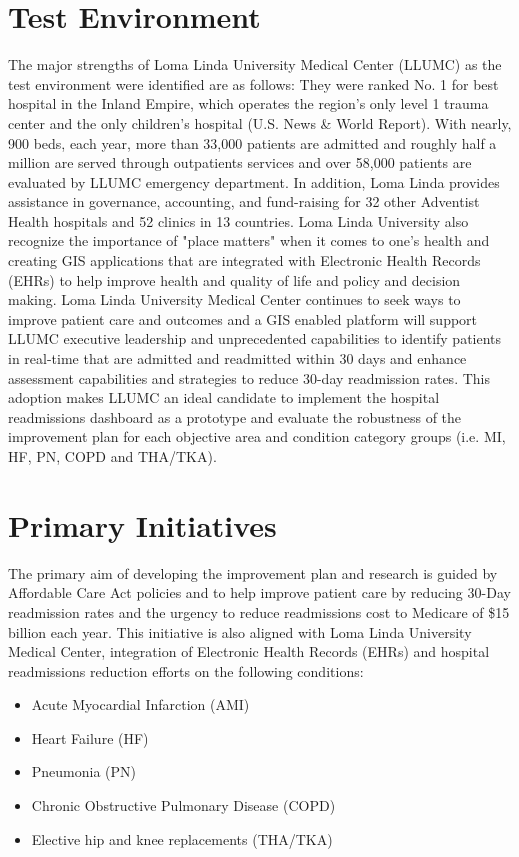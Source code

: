 \documentclass[11pt]{article}\usepackage[]{graphicx}\usepackage[]{color}
\begin{document}
\section{Test  Environment}
The major strengths of Loma Linda University Medical Center (LLUMC) as the test environment were identified are as follows: They were ranked No. 1 for best hospital in the Inland Empire, which operates the region's only level 1 trauma center and the only children's hospital (U.S. News & World Report). With nearly, 900 beds, each year, more than 33,000 patients are admitted and roughly half a million are served through outpatients services and over 58,000 patients are evaluated by LLUMC emergency department. In addition, Loma Linda provides assistance in governance, accounting, and fund-raising for 32 other Adventist Health hospitals and 52 clinics in 13 countries. Loma Linda University also recognize the importance of "place matters" when it comes to one's health and creating GIS applications that are integrated with Electronic Health Records (EHRs) to help improve health and quality of life and policy and decision making. Loma Linda University Medical Center continues to seek ways to improve patient care and outcomes and a GIS enabled platform will support LLUMC executive leadership and unprecedented capabilities to identify patients in real-time that are admitted and readmitted within 30 days and enhance assessment capabilities and strategies to reduce 30-day readmission rates. This adoption makes LLUMC an ideal candidate to implement the hospital readmissions dashboard as a  prototype and evaluate the robustness of the improvement plan for each objective area and condition category groups (i.e. MI, HF, PN, COPD and THA/TKA).

\section{Primary Initiatives}

The primary aim of developing the improvement plan and research is guided by Affordable Care Act policies and to help improve patient care by reducing 30-Day readmission rates and the urgency to reduce readmissions cost to Medicare of \$15 billion each year. This initiative is also aligned with Loma Linda University Medical Center, integration of Electronic Health Records (EHRs) and hospital readmissions reduction efforts on the following conditions:

\begin{itemize}

\item	Acute Myocardial Infarction (AMI) 
\item Heart Failure (HF)  
\item Pneumonia (PN)
\item Chronic Obstructive Pulmonary Disease (COPD)
\item Elective hip and knee replacements (THA/TKA)
\end{itemize}
\end{document}
